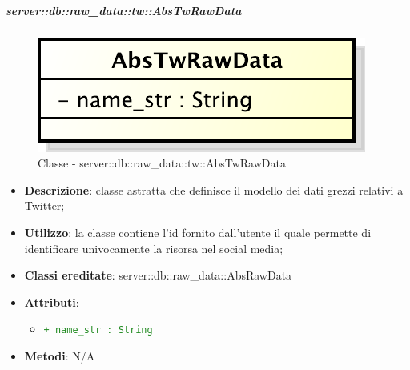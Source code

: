 		\subparagraph{server::db::raw\_data::tw::AbsTwRawData} %
		\label{subp:server_db_raw_data_tw_abstwrawdata}
			\begin{figure}[htbp]
				\centering
				\centerline{\includegraphics[scale=0.75]{./images/server/classes/db/abs_tw_raw_data.pdf}}
				\caption{Classe - server::db::raw\_data::tw::AbsTwRawData}
			\end{figure}
			\begin{itemize}
				\item \textbf{Descrizione}: classe astratta che definisce il modello dei dati grezzi relativi a Twitter;
				\item \textbf{Utilizzo}: la classe contiene l'id fornito dall'utente il quale permette di identificare univocamente la risorsa nel social media;
				\item \textbf{Classi ereditate}: server::db::raw\_data::AbsRawData
				\item \textbf{Attributi}:
					\begin{itemize}
						\item \textcolor{forestgreen}{\texttt{+ name\_str : String}}
					\end{itemize}
				\item \textbf{Metodi}: N/A
			\end{itemize}


